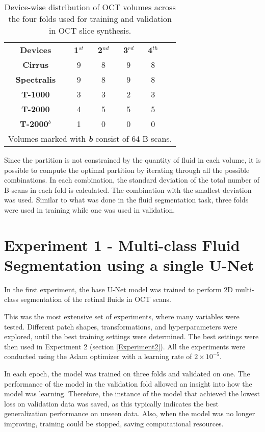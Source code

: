 \begin{table*}[!ht]
	\setlength{\tabcolsep}{6pt}
	\renewcommand{\arraystretch}{1.3}
	\caption{Device-wise distribution of OCT volumes across the four folds used for training and validation in OCT slice synthesis.}
	\centering
	\begin{tabular}{|c|c|c|c|c|c}
		\cline{1-5}
		\textbf{Devices} & \textbf{1$^{st}$} & \textbf{2$^{nd}$} & \textbf{3$^{rd}$} & \textbf{4$^{th}$} & \\
		\cline{1-5}
		\textbf{Cirrus} & 9 & 8 & 9 & 8 & \\
		\textbf{Spectralis} & 9 & 8 & 9 & 8 & \\
		\textbf{T-1000} & 3 & 3 & 2 & 3 & \\
		\textbf{T-2000} & 4 & 5 & 5 & 5 & \\
		\textbf{T-2000$^{b}$} & 1 & 0 & 0 & 0 & \\
		\cline{1-5}
		\multicolumn{6}{l}{Volumes marked with \textbf{\textit{b}} consist of 64 B-scans.} \\
	\end{tabular}
	\label{tab:FourFoldSplit}
\end{table*}
	
Since the partition is not constrained by the quantity of fluid in each volume, it is possible to compute the optimal partition by iterating through all the possible combinations. In each combination, the standard deviation of the total number of B-scans in each fold is calculated. The combination with the smallest deviation was used. Similar to what was done in the fluid segmentation task, three folds were used in training while one was used in validation.

\section{Experiment 1 - Multi-class Fluid Segmentation using a single U-Net}\label{Experiment1}

In the first experiment, the base U-Net model was trained to perform 2D multi-class segmentation of the retinal fluids in OCT scans.
\par
This was the most extensive set of experiments, where many variables were tested. Different patch shapes, transformations, and hyperparameters were explored, until the best training settings were determined. The best settings were then used in Experiment 2 (section \ref{Experiment2}). All the experiments were conducted using the Adam optimizer \parencite{Kingma2015} with a learning rate of $2 \times 10^{-5}$.
\par
In each epoch, the model was trained on three folds and validated on one. The performance of the model in the validation fold allowed an insight into how the model was learning. Therefore, the instance of the model that achieved the lowest loss on validation data was saved, as this typically indicates the best generalization performance on unseen data. Also, when the model was no longer improving, training could be stopped, saving computational resources.

